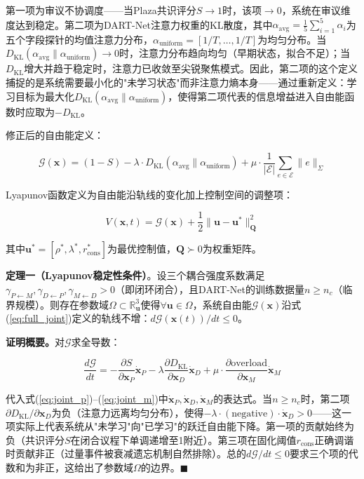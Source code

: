 \documentclass[twocolumn,10.5pt]{ctexart}
\def\R{\mathbb{R}}
\def\cE{\mathcal{E}}
\def\cG{\mathcal{G}}
\begin{document}
第一项为审议不协调度——当Plaza共识评分$S \to 1$时，该项$\to 0$，系统在审议维度达到稳定。第二项为DART-Net注意力权重的KL散度，其中$\alpha_{\text{avg}} = \frac{1}{5}\sum_{i=1}^5 \alpha_i$为五个字段探针的均值注意力分布，$\alpha_{\text{uniform}} = [1/T, \ldots, 1/T]$为均匀分布。当$D_{\text{KL}}(\alpha_{\text{avg}} \parallel \alpha_{\text{uniform}}) \to 0$时，注意力分布趋向均匀（早期状态，拟合不足）；当$D_{\text{KL}}$增大并趋于稳定时，注意力已收敛至尖锐聚焦模式。因此，第二项的这个定义捕捉的是系统需要最小化的"未学习状态"而非注意力熵本身——通过重新定义：学习目标为最大化$D_{\text{KL}}(\alpha_{\text{avg}} \parallel \alpha_{\text{uniform}})$，使得第二项代表的信息增益进入自由能函数时应取为$-D_{\text{KL}}$。

修正后的自由能定义：

\begin{equation}
\cG(\mathbf{x}) = (1 - S) - \lambda \cdot D_{\text{KL}}(\alpha_{\text{avg}} \parallel \alpha_{\text{uniform}}) + \mu \cdot \frac{1}{|\cE|}\sum_{e\in \cE} \|e\|_{\Sigma}
\label{eq:corrected_free_energy}
\end{equation}

Lyapunov函数定义为自由能沿轨线的变化加上控制空间的调整项：

\begin{equation}
V(\mathbf{x}, t) = \cG(\mathbf{x}) + \frac{1}{2}\|\mathbf{u} - \mathbf{u}^*\|^2_{\mathbf{Q}}
\label{eq:lyapunov}
\end{equation}

其中$\mathbf{u}^* = [\rho^*, \lambda^*, r_{\text{cons}}^*]$为最优控制值，$\mathbf{Q} \succ 0$为权重矩阵。

\textbf{定理一（Lyapunov稳定性条件）}。设三个耦合强度系数满足$\gamma_{P\leftarrow M}, \gamma_{D\leftarrow P}, \gamma_{M\leftarrow D} > 0$（即闭环闭合），且DART-Net的训练数据量$n \geq n_c$（临界规模）。则存在参数域$\Omega \subset \R^3_{\mathbf{u}}$使得$\forall \mathbf{u} \in \Omega$，系统自由能$\cG(\mathbf{x})$沿式(\ref{eq:full_joint})定义的轨线不增：$d\cG(\mathbf{x}(t))/dt \leq 0$。

\textbf{证明概要。}对$\cG$求全导数：

\begin{equation}
\frac{d\cG}{dt} = -\frac{\partial S}{\partial \mathbf{x}_P} \dot{\mathbf{x}}_P - \lambda \frac{\partial D_{\text{KL}}}{\partial \mathbf{x}_D} \dot{\mathbf{x}}_D + \mu \cdot \frac{\partial \text{overload}}{\partial \mathbf{x}_M} \dot{\mathbf{x}}_M
\label{eq:dGdt}
\end{equation}

代入式(\ref{eq:joint_p})--(\ref{eq:joint_m})中$\dot{\mathbf{x}}_P, \dot{\mathbf{x}}_D, \dot{\mathbf{x}}_M$的表达式。当$n \geq n_c$时，第二项$\partial D_{\text{KL}}/\partial \mathbf{x}_D$为负（注意力远离均匀分布），使得$-\lambda \cdot (\text{negative}) \cdot \dot{\mathbf{x}}_D > 0$——这一项实际上代表系统从"未学习"向"已学习"的跃迁自由能下降。第一项的贡献始终为负（共识评分$S$在闭合议程下单调递增至1附近）。第三项在固化阈值$r_{\text{cons}}$正确调谐时贡献非正（过量事件被衰减遗忘机制自然排除）。总的$d\cG/dt \leq 0$要求三个项的代数和为非正，这给出了参数域$\Omega$的边界。$\blacksquare$
\end{document}
